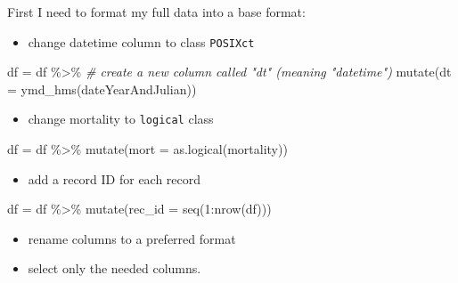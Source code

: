 \documentclass[
]{book}
\newenvironment{Shaded}{\begin{snugshade}}{\end{snugshade}}
\newcommand{\AttributeTok}[1]{\textcolor[rgb]{0.77,0.63,0.00}{#1}}
\newcommand{\CommentTok}[1]{\textcolor[rgb]{0.56,0.35,0.01}{\textit{#1}}}
\newcommand{\DecValTok}[1]{\textcolor[rgb]{0.00,0.00,0.81}{#1}}
\newcommand{\FunctionTok}[1]{\textcolor[rgb]{0.00,0.00,0.00}{#1}}
\newcommand{\NormalTok}[1]{#1}
\newcommand{\OtherTok}[1]{\textcolor[rgb]{0.56,0.35,0.01}{#1}}
\newcommand{\SpecialCharTok}[1]{\textcolor[rgb]{0.00,0.00,0.00}{#1}}
\providecommand{\tightlist}{%
  \setlength{\itemsep}{0pt}\setlength{\parskip}{0pt}}
\begin{document}
First I need to format my full data into a base format:

\begin{itemize}
\tightlist
\item
  change datetime column to class \texttt{POSIXct}
\end{itemize}

\begin{Shaded}
\begin{Highlighting}[]
\NormalTok{df }\OtherTok{=}\NormalTok{ df }\SpecialCharTok{\%\textgreater{}\%}
  \CommentTok{\# create a new column called "dt" (meaning "datetime")}
  \FunctionTok{mutate}\NormalTok{(}\AttributeTok{dt =} \FunctionTok{ymd\_hms}\NormalTok{(dateYearAndJulian))}
\end{Highlighting}
\end{Shaded}

\begin{itemize}
\tightlist
\item
  change mortality to \texttt{logical} class
\end{itemize}

\begin{Shaded}
\begin{Highlighting}[]
\NormalTok{df }\OtherTok{=}\NormalTok{ df }\SpecialCharTok{\%\textgreater{}\%}
  \FunctionTok{mutate}\NormalTok{(}\AttributeTok{mort =} \FunctionTok{as.logical}\NormalTok{(mortality))}
\end{Highlighting}
\end{Shaded}

\begin{itemize}
\tightlist
\item
  add a record ID for each record
\end{itemize}

\begin{Shaded}
\begin{Highlighting}[]
\NormalTok{df }\OtherTok{=}\NormalTok{ df }\SpecialCharTok{\%\textgreater{}\%}
  \FunctionTok{mutate}\NormalTok{(}\AttributeTok{rec\_id =} \FunctionTok{seq}\NormalTok{(}\DecValTok{1}\SpecialCharTok{:}\FunctionTok{nrow}\NormalTok{(df)))}
\end{Highlighting}
\end{Shaded}

\begin{itemize}
\tightlist
\item
  rename columns to a preferred format
\item
  select only the needed columns.
\end{itemize}
\end{document}
